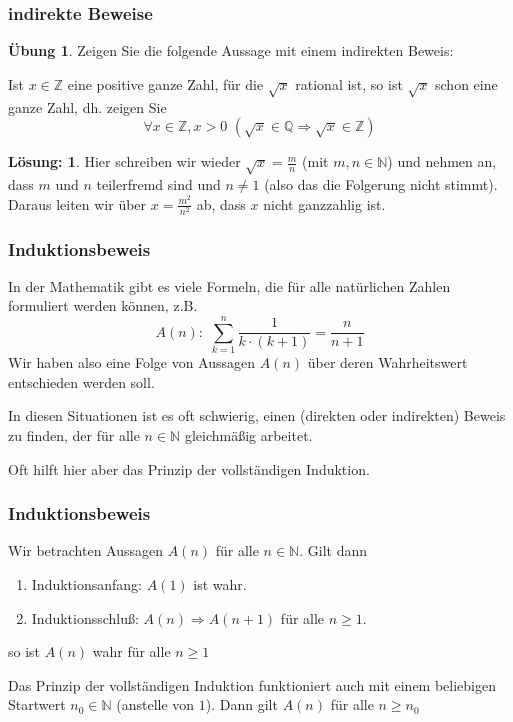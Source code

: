 \documentclass[hyperref={pdfpagelabels=false}]{beamer}
\theoremstyle{plain}%
\theoremstyle{definition}
\newtheorem*{uebung}{Übung}
\newtheorem*{sol}{Lösung:}
\theoremstyle{remark}
\begin{document}
\begin{frame}
\frametitle{indirekte Beweise}

\begin{uebung}
Zeigen Sie die folgende Aussage mit einem indirekten Beweis: 

Ist $x \in \mathbb Z$ eine positive ganze Zahl, für die $\sqrt{x}$ rational ist, so ist $\sqrt{x}$ schon eine 
ganze Zahl, dh.  zeigen Sie 
	$$ \forall x \in \mathbb Z, x > 0 \,\, \left( \sqrt{x} \in \mathbb Q \Longrightarrow \sqrt{x} \in \mathbb Z 
	\right) $$ 
\end{uebung}

\pause \pause 

\begin{sol}
Hier schreiben wir wieder $\sqrt{x} = \frac {m}{n}$ (mit $m,n \in \mathbb N$) und nehmen an, dass 
$m$ und $n$ teilerfremd sind und $n \neq 1$ (also das die Folgerung nicht stimmt). Daraus leiten wir 
über $x = \frac {m^2}{n^2}$ ab, dass $x$ nicht ganzzahlig ist. 
\end{sol}
\end{frame}

\begin{frame}
\frametitle{Induktionsbeweis}

In der Mathematik gibt es viele Formeln, die für alle natürlichen Zahlen formuliert werden können, z.B. 
	$$ A(n) : \,\, \sum\limits_{k = 1}^n \frac {1}{k \cdot (k+1)}  = \frac {n}{n+1} $$
\pause 
Wir haben also eine Folge von Aussagen $A(n)$ über deren Wahrheitswert entschieden werden soll. 

\pause 

In diesen Situationen ist es oft schwierig, einen (direkten oder indirekten) Beweis zu finden, der für alle 
$n \in \mathbb N$ gleichmäßig arbeitet. 

\pause 

Oft hilft hier aber das Prinzip der vollständigen Induktion.  
\end{frame}

\begin{frame}
\frametitle{Induktionsbeweis}

Wir betrachten Aussagen $A(n)$ für alle $n \in \mathbb N$. Gilt dann 
\begin{enumerate}
\item<2-> Induktionsanfang: $A(1)$ ist wahr.
\item<3-> Induktionsschluß: $A(n) \Longrightarrow A(n+1)$ für alle $n \geq 1$.
\end{enumerate}
\pause \pause \pause 

so ist $A(n)$ wahr für alle $n \geq 1$

\pause
Das Prinzip der vollständigen Induktion funktioniert auch mit einem beliebigen Startwert $n_0 \in \mathbb N$ 
(anstelle von $1$). Dann gilt $A(n)$ für alle $n \geq n_0$

\end{frame}
\end{document}
